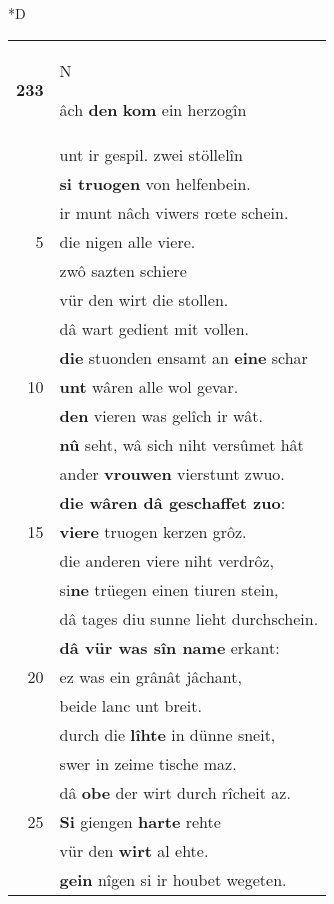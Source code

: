 \documentclass[8pt,a4paper,notitlepage]{article}
\begin{document}
\begin{table}[ht]
\begin{minipage}[t]{0.5\linewidth}
\small
\begin{center}*D
\end{center}
\begin{tabular}{rl}
\textbf{233} & \begin{large}N\end{large}âch \textbf{den} \textbf{kom} ein herzogîn\\ 
 & unt ir gespil. zwei stöllelîn\\ 
 & \textbf{si truogen} von helfenbein.\\ 
 & ir munt nâch viwers rœte schein.\\ 
5 & die nigen alle viere.\\ 
 & zwô sazten schiere\\ 
 & vür den wirt die stollen.\\ 
 & dâ wart gedient mit vollen.\\ 
 & \textbf{die} stuonden ensamt an \textbf{eine} schar\\ 
10 & \textbf{unt} wâren alle wol gevar.\\ 
 & \textbf{den} vieren was gelîch ir wât.\\ 
 & \textbf{nû} seht, wâ sich niht versûmet hât\\ 
 & ander \textbf{vrouwen} vierstunt zwuo.\\ 
 & \textbf{die wâren dâ geschaffet zuo}:\\ 
15 & \textbf{viere} truogen kerzen grôz.\\ 
 & die anderen viere niht verdrôz,\\ 
 & si\textbf{ne} trüegen einen tiuren stein,\\ 
 & dâ tages diu sunne lieht durchschein.\\ 
 & \textbf{dâ vür was sîn name} erkant:\\ 
20 & ez was ein grânât jâchant,\\ 
 & beide lanc unt breit.\\ 
 & durch die \textbf{lîhte} in dünne sneit,\\ 
 & swer in zeime tische maz.\\ 
 & dâ \textbf{obe} der wirt durch rîcheit az.\\ 
25 & \textbf{Si} giengen \textbf{harte} rehte\\ 
 & vür den \textbf{wirt} al ehte.\\ 
 & \textbf{gein} nîgen si ir houbet wegeten.\\ 

\end{tabular}
\end{minipage}
\end{table}
\end{document}
